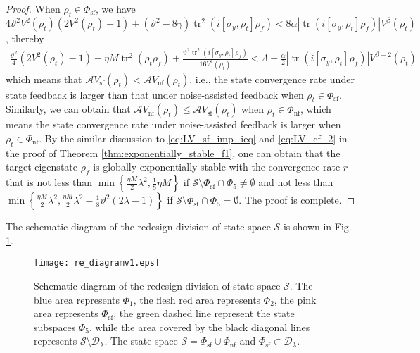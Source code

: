 \documentclass[]{elsarticle}
\begin{document}
\begin{proof}
	When $\rho_t\in \Phi_{\mathrm{sf}}$, we have $4\vartheta^2V^2\left(\rho_{t}\right)\left(2V^2\left(\rho_{t}\right)-1\right)+\left(\vartheta^2-8\gamma\right) \operatorname{tr}^2\left(i\left[\sigma_y, \rho_t\right]\rho_{f}\right)
	<8\alpha|\operatorname{tr}\left(i\left[\sigma_{y}, \rho_{t}\right] {\rho_f}\right)|V^{\beta}\left(\rho_{t}\right)$,
	thereby 
	\begin{equation*}
		\begin{aligned}
			\frac{\vartheta^2}{4}\left(2V^2\left(\rho_{t}\right)-1\right)+\eta M \operatorname{tr}^{2}\left(\rho_t \rho_{f}\right)+\frac{\vartheta^2 \operatorname{tr}^2\left(i\left[\sigma_y, \rho_t\right]\rho_{f}\right)}{16V^2\left(\rho_{t}\right)}
			<\Lambda+\frac{\alpha}{2}|\operatorname{tr}\left(i\left[\sigma_{y}, \rho_{t}\right] {\rho_f}\right)| V^{\beta-2}\left(\rho_{t}\right)
		\end{aligned}
	\end{equation*}
	which means that $\mathcal{A}V_{\mathrm{sf}}\left(\rho_{t}\right)<\mathcal{A} V_{\mathrm{nf}}\left(\rho_{t}\right)$, i.e., the state convergence rate under state feedback is larger than that under noise-assisted feedback when $\rho_t\in \Phi_{\mathrm{sf}}$. Similarly, we can obtain that $\mathcal{A}V_{\mathrm{nf}}\left(\rho_{t}\right)\le\mathcal{A} V_{\mathrm{sf}}\left(\rho_{t}\right)$ when $\rho_t\in \Phi_{\mathrm{nf}}$, which means the state convergence rate under noise-assisted feedback is larger when $\rho_t\in \Phi_{\mathrm{nf}}$. By the similar discussion to \eqref{eq:LV_sf_imp_ieq} and \eqref{eq:LV_cf_2} in the proof of Theorem \ref{thm:exponentially_stable_f1}, one can obtain that the target eigenstate $\rho_f$ is globally exponentially stable with the convergence rate $r$ that is not less than $\min\left\{\frac{{\eta M}}{2}\lambda^{2}, \frac{1}{8}\eta M\right\}$ if $\mathcal{S}\setminus \Phi_{\mathrm{sf}}\cap\Phi_5\neq\emptyset$ and not less than $\min\left\{\frac{{\eta M}}{2}\lambda^{2}, \frac{{\eta M}}{2}\lambda^{2}-\frac{1}{8}\vartheta^2\left(2\lambda-1\right)\right\}$ if $\mathcal{S}\setminus \Phi_{\mathrm{sf}}\cap\Phi_5=\emptyset$. The proof is complete.
\end{proof}

The schematic diagram of the redesign division of state space $\mathcal{S}$ is shown in Fig. \ref{figur:re_diagram}.
\begin{figure}[!htbp]
	\centering
	\texttt{[image: re\_diagramv1.eps]}
	\caption{Schematic diagram of the redesign division of state space $\mathcal{S}$. The blue area represents $\Phi_1$, the flesh red area represents $\Phi_2$,  the pink area represents $\Phi_{\mathrm{sf}}$, the green dashed line represent the state subspaces $\Phi_5$, while the area covered by the black diagonal lines represents $\mathcal{S}\setminus \mathcal{D}_\lambda$. The state space $\mathcal{S}=\Phi_{\mathrm{sf}}\cup\Phi_{\mathrm{nf}}$ and $\Phi_{\mathrm{sf}}\subset \mathcal{D}_\lambda$.}
	\label{figur:re_diagram}
\end{figure}
\end{document}
